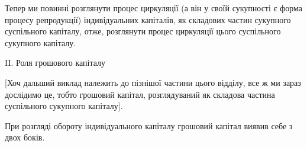 Тепер ми повинні розглянути процес циркуляції (а він у своїй сукупності
є форма процесу репродукції) індивідуальних капіталів, як складових
частин сукупного суспільного капіталу, отже, розглянути процес
циркуляції цього суспільного сукупного капіталу.

II. Роля грошового капіталу

[Хоч дальший виклад належить до пізнішої частини цього відділу,
все ж ми зараз дослідимо це, тобто грошовий капітал, розглядуваний
як складова частина суспільного сукупного капіталу].

При розгляді обороту індивідуального капіталу грошовий капітал виявив
себе з двох боків.
